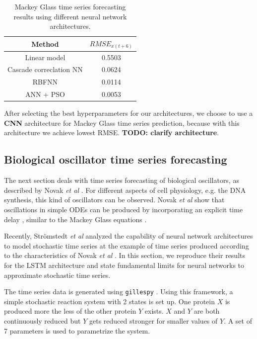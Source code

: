 \documentclass{article}
\begin{document}
\begin{table}
  \centering
  \begin{tabular}{c|c} 
    Method &  $RMSE_{x(t+6)}$ \\
    \hline
    Linear model & 0.5503 \\
    Cascade correclation NN & 0.0624 \\
    RBFNN & 0.0114 \\
    ANN + PSO \cite{caraballo2016} & 0.0053 \\
  \end{tabular}
  \caption{Mackey Glass time series forecasting results using different neural
  network architectures.}
  \label{tab:mackey_results}
\end{table}

After selecting the best hyperparameters for our architectures, we choose to 
use a \textbf{CNN} architecture for Mackey Glass time series prediction, 
because with this architecture we achieve lowest RMSE. \textbf{TODO: clarify
architecture}.

\subsection{Biological oscillator time series forecasting}

The next section deals with time series forecasting of biological oscillators, 
as described by Novak \textit{et al} \cite{novak2008}. For different aspects of
cell physiology, e.g. the DNA synthesis, this kind of oscillators can be 
observed. Novak \textit{et al} show that oscillations in simple ODEs can be 
produced by incorporating an explicit time delay \cite{novak2008}, similar to 
the Mackey Glass equations \cite{mackey1977}.

Recently, Strömstedt \textit{et al} analyzed the capability of neural network
architectures to model stochastic time series \cite{stroemstedt2018} at the 
example of time series produced according to the characteristics of Novak 
\textit{et al} \cite{novak2008}. In this section, we reproduce their results for
the LSTM architecture and state fundamental limits for neural networks to 
approximate stochastic time series.


The time series data is generated using \texttt{gillespy} \cite{abel2016}.
Using this framework, a simple stochastic reaction system with 2 states is 
set up. One protein $X$ is produced more the less of the other protein $Y$
exists. $X$ and $Y$ are both continuously reduced but $Y$ gets reduced stronger
for smaller values of $Y$. A set of 7 parameters is used to parametrize the 
system.
\end{document}
